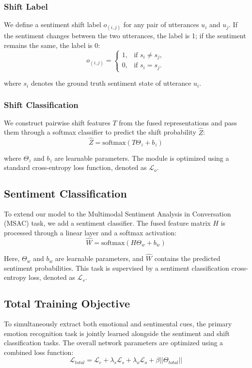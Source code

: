 \documentclass[runningheads]{llncs}
\begin{document}
\subsubsection{Shift Label}
We define a sentiment shift label $o_{(i,j)}$ for any pair of utterances $u_i$ and $u_j$. If the sentiment changes between the two utterances, the label is 1; if the sentiment remains the same, the label is 0:
\begin{equation}
  o_{(i,j)} =
  \begin{cases}
    1, & \text{if } s_i \neq s_j, \\
    0, & \text{if } s_i = s_j.
  \end{cases}
\end{equation}

\noindent where $s_i$ denotes the ground truth sentiment state of utterance $u_i$.

\subsubsection{Shift Classification}
We construct pairwise shift features $T$ from the fused representations and pass them through a softmax classifier to predict the shift probability $\hat{Z}$:
\begin{equation}
  \hat{Z} = \text{softmax}(T\Theta_z + b_z)
\end{equation}

\noindent where $\Theta_z$ and $b_z$ are learnable parameters. The module is optimized using a standard cross-entropy loss function, denoted as $\mathcal{L}_o$.

\subsection{Sentiment Classification}
To extend our model to the Multimodal Sentiment Analysis in Conversation (MSAC) task, we add a sentiment classifier. The fused feature matrix $H$ is processed through a linear layer and a softmax activation:
\begin{equation}
  \hat{W} = \text{softmax}(H\Theta_w + b_w)
\end{equation}

\noindent Here, $\Theta_w$ and $b_w$ are learnable parameters, and $\hat{W}$ contains the predicted sentiment probabilities. This task is supervised by a sentiment classification cross-entropy loss, denoted as $\mathcal{L}_s$.

\subsection{Total Training Objective}
To simultaneously extract both emotional and sentimental cues, the primary emotion recognition task is jointly learned alongside the sentiment and shift classification tasks. The overall network parameters are optimized using a combined loss function:
\begin{equation}
  \mathcal{L}_{total} = \mathcal{L}_e + \lambda_s \mathcal{L}_s + \lambda_o \mathcal{L}_o + \beta ||\Theta_{total}||
\end{equation}
\end{document}
